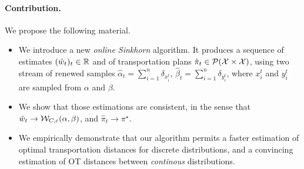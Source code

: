\paragraph{Contribution.}We propose the following material.
\begin{itemize}
    \item We introduce a new \textit{online Sinkhorn} algorithm. It produces a sequence of
    estimates $(\hat w_t)_t \in \mathbb{R}$ and of transportation plans $\hat \pi_t \in
    \mathcal{P}(\mathcal{X} \times \mathcal{X})$, using two stream of renewed samples $\hat \alpha_t =
    \sum_{i=1}^n \delta_{x^t_i}$, $\hat \beta_t = \sum_{i=1}^n \delta_{y^t_i}$,
    where $x^t_i$ and $y^t_i$ are sampled from $\alpha$ and $\beta$.
    \item We show that those estimations are consistent, in the sense that $\hat
    w_t \to \mathcal{W}_{C,\varepsilon}(\alpha, \beta)$, and $\hat \pi_t \to \pi^\star$.
    \item We empirically demonstrate that our algorithm permits a faster
    estimation of optimal transportation distances for discrete distributions,
    and a convincing estimation of OT distances between \textit{continous} distributions.
\end{itemize}